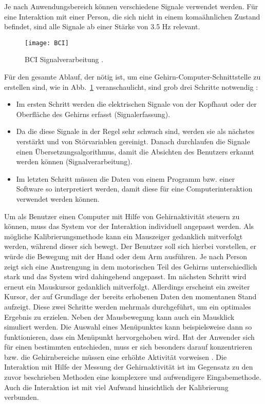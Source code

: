 \vspace{\baselineskip}
Je nach Anwendungsbereich können verschiedene Signale verwendet werden. Für eine Interaktion mit einer Person, die sich nicht in einem komaähnlichen Zustand befindet, sind alle Signale ab einer Stärke von 3.5 Hz relevant.
\newline \newline
%
%
\begin{figure}
\centering
\texttt{[image: BCI]}
\caption{BCI Signalverarbeitung \cite{BRAIN}.}
\label{fig:BCI}
\end{figure}
%
%
Für den gesamte Ablauf, der nötig ist, um eine Gehirn-Computer-Schnittstelle zu erstellen sind, wie in Abb.~\ref{fig:BCI} veranschaulicht, sind grob drei Schritte notwendig \cite{BRAIN}:
\begin{itemize}
      \item Im ersten Schritt werden die elektrischen Signale von der Kopfhaut oder der Oberfläche des Gehirns erfasst (Signalerfassung).
      \item Da die diese Signale in der Regel sehr schwach sind, werden sie als nächstes verstärkt und von Störvariablen gereinigt. Danach durchlaufen die Signale einen Übersetzungsalgorithmus, damit die Absichten des Benutzers erkannt werden können (Signalverarbeitung).
			\item Im letzten Schritt müssen die Daten von einem Programm bzw. einer Software so interpretiert werden, damit diese für eine Computerinteraktion verwendet werden können.
\end{itemize}
%
%
\vspace{\baselineskip}
\vspace{\baselineskip}
\vspace{\baselineskip}
\vspace{\baselineskip}
Um als Benutzer einen Computer mit Hilfe von Gehirnaktivität steuern zu können, muss das System vor der Interaktion individuell angepasst werden. Als mögliche Kalibrierungsmethode kann ein Mauszeiger gedanklich mitverfolgt werden, während dieser sich bewegt. Der Benutzer soll sich hierbei vorstellen, er würde die Bewegung mit der Hand oder dem Arm ausführen. Je nach Person zeigt sich eine Anstrengung in dem motorischen Teil des Gehirns unterschiedlich stark und das System wird dahingehend angepasst. Im nächsten Schritt wird erneut ein Mauskursor gedanklich mitverfolgt. Allerdings erscheint ein zweiter Kursor, der auf Grundlage der bereits erhobenen Daten den momentanen Stand aufzeigt. Diese zwei Schritte werden mehrmals durchgeführt, um ein optimales Ergebnis zu erzielen. Neben der Mausbewegung kann auch ein Mausklick simuliert werden. Die Auswahl eines Menüpunktes kann beispielsweise dann so funktionieren, dass ein Menüpunkt hervorgehoben wird. Hat der Anwender sich für einen bestimmten entschieden, muss er sich besonders darauf konzentrieren bzw. die Gehirnbereiche müssen eine erhöhte Aktivität vorweisen \cite{BrainInt}.
\newline \newline
Die Interaktion mit Hilfe der Messung der Gehirnaktivität ist im Gegensatz zu den zuvor beschrieben Methoden eine komplexere und aufwendigere Eingabemethode. Auch die Interaktion ist mit viel Aufwand hinsichtlich der Kalibrierung verbunden.
